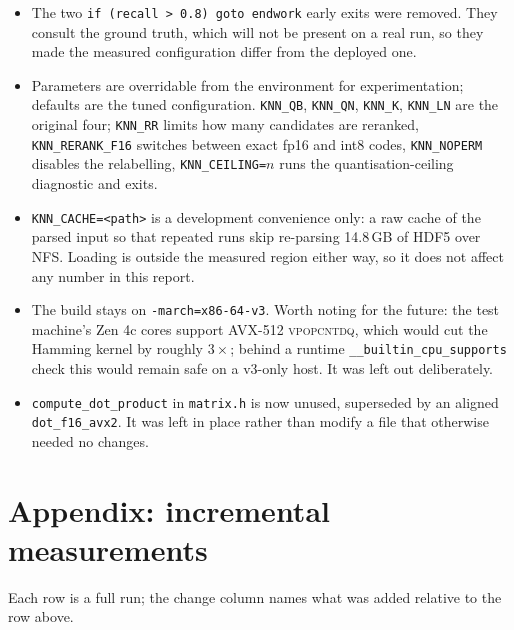 \documentclass[11pt,a4paper]{article}
\newcommand{\code}[1]{\texttt{\small #1}}
\begin{document}
\begin{itemize}
\item The two \code{if (recall > 0.8) goto endwork} early exits were removed.
They consult the ground truth, which will not be present on a real run, so they
made the measured configuration differ from the deployed one.

\item Parameters are overridable from the environment for experimentation;
defaults are the tuned configuration. \code{KNN\_QB}, \code{KNN\_QN},
\code{KNN\_K}, \code{KNN\_LN} are the original four; \code{KNN\_RR} limits how
many candidates are reranked, \code{KNN\_RERANK\_F16} switches between exact
fp16 and int8 codes, \code{KNN\_NOPERM} disables the relabelling,
\code{KNN\_CEILING=$n$} runs the quantisation-ceiling diagnostic and exits.

\item \code{KNN\_CACHE=<path>} is a development convenience only: a raw cache of
the parsed input so that repeated runs skip re-parsing 14.8\,GB of HDF5 over
NFS. Loading is outside the measured region either way, so it does not affect
any number in this report.

\item The build stays on \code{-march=x86-64-v3}. Worth noting for the future:
the test machine's Zen 4c cores support AVX-512 \textsc{vpopcntdq}, which would
cut the Hamming kernel by roughly $3\times$; behind a runtime
\code{\_\_builtin\_cpu\_supports} check this would remain safe on a v3-only
host. It was left out deliberately.

\item \code{compute\_dot\_product} in \code{matrix.h} is now unused, superseded
by an aligned \code{dot\_f16\_avx2}. It was left in place rather than modify a
file that otherwise needed no changes.
\end{itemize}

\section*{Appendix: incremental measurements}

Each row is a full run; the change column names what was added relative to the
row above.
\end{document}
